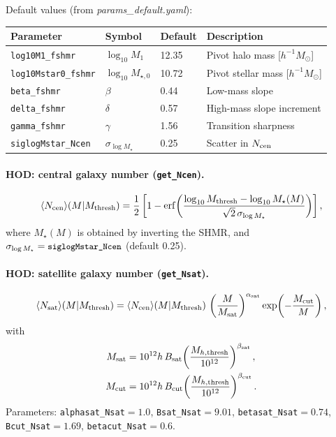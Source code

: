 \documentclass[12pt,a4paper]{article}
\newcommand{\code}[1]{\texttt{\small #1}}
\newcommand{\param}[1]{\texttt{\small #1}}
\newcommand{\file}[1]{\textit{\small #1}}
\begin{document}
Default values (from \file{params\_default.yaml}):
\begin{center}
\begin{tabular}{llll}
\toprule
Parameter & Symbol & Default & Description \\
\midrule
\param{log10M1\_fshmr}       & $\log_{10}M_1$        & 12.35 & Pivot halo mass [$h^{-1}M_\odot$] \\
\param{log10Mstar0\_fshmr}   & $\log_{10}M_{\star,0}$& 10.72 & Pivot stellar mass [$h^{-1}M_\odot$] \\
\param{beta\_fshmr}          & $\beta$               & 0.44  & Low-mass slope \\
\param{delta\_fshmr}         & $\delta$              & 0.57  & High-mass slope increment \\
\param{gamma\_fshmr}         & $\gamma$              & 1.56  & Transition sharpness \\
\param{siglogMstar\_Ncen}    & $\sigma_{\log M_\star}$& 0.25 & Scatter in $N_{\rm cen}$ \\
\bottomrule
\end{tabular}
\end{center}

\paragraph{HOD: central galaxy number (\code{get\_Ncen}).}
\begin{equation}
  \langle N_{\rm cen}\rangle(M|M_{\rm thresh}) =
  \frac{1}{2}\left[1 - {\rm erf}\!\left(\frac{\log_{10}M_{\rm thresh}-\log_{10}M_\star(M)}
  {\sqrt{2}\,\sigma_{\log M_\star}}\right)\right],
\end{equation}
where $M_\star(M)$ is obtained by inverting the SHMR, and
$\sigma_{\log M_\star}=\param{siglogMstar\_Ncen}$ (default 0.25).

\paragraph{HOD: satellite galaxy number (\code{get\_Nsat}).}
\begin{equation}
  \langle N_{\rm sat}\rangle(M|M_{\rm thresh}) =
  \langle N_{\rm cen}\rangle(M|M_{\rm thresh})\,
  \left(\frac{M}{M_{\rm sat}}\right)^{\alpha_{\rm sat}}
  \exp\!\left(-\frac{M_{\rm cut}}{M}\right),
\end{equation}
with
\begin{align}
  M_{\rm sat} &= 10^{12}h\,B_{\rm sat}\!\left(\frac{M_{h,\rm thresh}}{10^{12}}\right)^{\beta_{\rm sat}}, \\
  M_{\rm cut} &= 10^{12}h\,B_{\rm cut}\!\left(\frac{M_{h,\rm thresh}}{10^{12}}\right)^{\beta_{\rm cut}}.
\end{align}
Parameters: \param{alphasat\_Nsat}$=1.0$, \param{Bsat\_Nsat}$=9.01$,
\param{betasat\_Nsat}$=0.74$, \param{Bcut\_Nsat}$=1.69$,
\param{betacut\_Nsat}$=0.6$.
\end{document}
